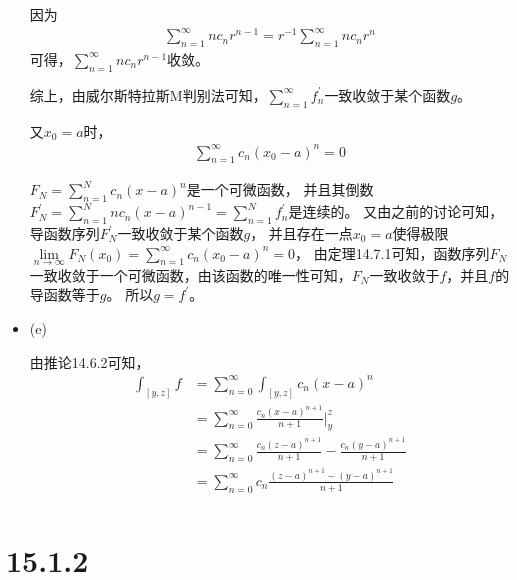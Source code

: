 \documentclass{article}
\begin{document}
\begin{itemize}
        因为
        \begin{align*}
          \sum\limits_{n = 1}^\infty nc_nr^{n - 1} = r^{-1} \sum\limits_{n = 1}^\infty nc_nr^{n}
        \end{align*}
        可得，$\sum\limits_{n = 1}^\infty nc_nr^{n - 1}$收敛。

        综上，由威尔斯特拉斯M判别法可知，$\sum \limits_{n = 1}^\infty f_n^\prime$一致收敛于某个函数$g$。

        又$x_0 = a$时，
        \begin{align*}
          \sum \limits_{n = 1}^\infty c_n(x_0 - a)^n = 0
        \end{align*}

        $F_N = \sum \limits_{n = 1}^N c_n(x - a)^n$是一个可微函数，
        并且其倒数$F_N^\prime = \sum \limits_{n = 1}^N nc_n(x - a)^{n - 1} = \sum \limits_{n = 1}^N f_n^\prime$是连续的。
        又由之前的讨论可知，导函数序列$F_N^\prime$一致收敛于某个函数$g$，
        并且存在一点$x_0 = a$使得极限$\lim\limits_{n \to \infty} F_N(x_0) = \sum \limits_{n = 1}^\infty c_n(x_0 - a)^n = 0$，
        由定理14.7.1可知，函数序列$F_N$一致收敛于一个可微函数，由该函数的唯一性可知，$F_N$一致收敛于$f$，并且$f$的导函数等于$g$。
        所以$g = f^\prime$。

  \item (e)

        由推论14.6.2可知，
        \begin{align*}
          \int_{[y, z]} f
           & = \sum\limits_{n = 0}^\infty \int_{[y, z]} c_n(x - a)^n                                          \\
           & = \sum\limits_{n = 0}^\infty \frac{c_n(x - a)^{n + 1}}{n + 1}|_y^z                               \\
           & = \sum\limits_{n = 0}^\infty \frac{c_n(z - a)^{n + 1}}{n + 1} - \frac{c_n(y - a)^{n + 1}}{n + 1} \\
           & = \sum\limits_{n = 0}^\infty c_n\frac{(z - a)^{n + 1} - (y - a)^{n + 1}}{n + 1}                  \\
        \end{align*}
\end{itemize}

\section*{15.1.2}
\end{document}
